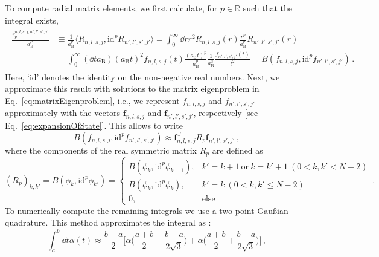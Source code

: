 \documentclass[fontsize=12pt,
               twoside=false,
               BCOR=0mm,
               DIV=14,
               overfullrule=true, %
               toc=bibliography,
               headinclude=true,
               footinclude=false]{scrartcl}
\numberwithin{equation}{section}
\newcommand{\aB}{a_\mathrm{B}}
\begin{document}
    To compute radial matrix elements, we first calculate, for $p\in\mathbb{R}$
    such that the integral exists,
    \begin{align}\label{eq:radialMatrixElement}
        \begin{split}
            \frac{r^{n,l,s,j;n',l',s',j'}_p}{\aB^p}
            &\equiv
            \frac{1}{\aB^p} \langle R_{n,l,s,j},
            \mathrm{id}^p R_{n',l',s',j'} \rangle
            =
            \int^\infty_0 \dd{r} r^2
            R_{n,l,s,j}(r)
            \frac{r^p}{\aB^p}
            R_{n',l',s',j'}(r)
        \\
            &=
            \int^\infty_0 (\dd{t} \aB) (\aB t)^2
            f_{n,l,s,j}(t)
            \frac{(\aB t)^p}{\aB^p} \frac{1}{\aB^3}
            \frac{f_{n',l',s',j'}(t)}{t^2}
            =
            B(f_{n,l,s,j}, \mathrm{id}^p f_{n',l',s',j'})
        \,.
        \end{split}
    \end{align}
    Here, `$\mathrm{id}$' denotes the identity on the non-negative real numbers.
    Next, we approximate this result with solutions to the matrix eigenproblem
    in Eq.~\eqref{eq:matrixEigenproblem}, i.e., we represent $f_{n,l,s,j}$ and
    $f_{n',l',s',j'}$ approximately with the vectors $\bm{f}_{n,l,s,j}$ and
    $\bm{f}_{n',l',s',j'}$, respectively [see Eq.~\eqref{eq:expansionOfState}].
    This allows to write
    \begin{equation}
        B(f_{n,l,s,j}, \mathrm{id}^p f_{n',l',s',j'})
        \approx
        \bm{f}_{n,l,s,j}^\mathrm{T} R_p \bm{f}_{n',l',s',j'}
    \,,
    \end{equation}
    where the components of the real symmetric matrix $R_p$ are defined as
    \begin{equation}
        (R_p)_{k,k'}
        =
        B(\phi_k,\mathrm{id}^p\phi_{k'})
        =
        \begin{cases}
            B(\phi_k,\mathrm{id}^p\phi_{k+1}),
            & k'=k+1 \ \text{or} \ k=k'+1 \ (0<k,k'<N-2)
        \\
            B(\phi_k,\mathrm{id}^p\phi_{k}),
            & k'=k \ (0<k,k'\leq{N-2})
        \\
        0, & \text{else}
        \end{cases}
    \,.
    \end{equation}
    To numerically compute the remaining integrals we use a two-point
    Gau\ss{i}an quadrature. This method approximates the integral as
    \cite{burden2011}:
    \begin{equation}
        \int^b_a \dd{t} \alpha(t)
        \approx
        \frac{b-a}{2}
        \bigg[
            \alpha\bigg(\frac{a+b}{2}-\frac{b-a}{2\sqrt{3}}\bigg)
            +
            \alpha\bigg(\frac{a+b}{2}+\frac{b-a}{2\sqrt{3}}\bigg)
        \bigg]
    \,,
    \end{equation}
\end{document}
